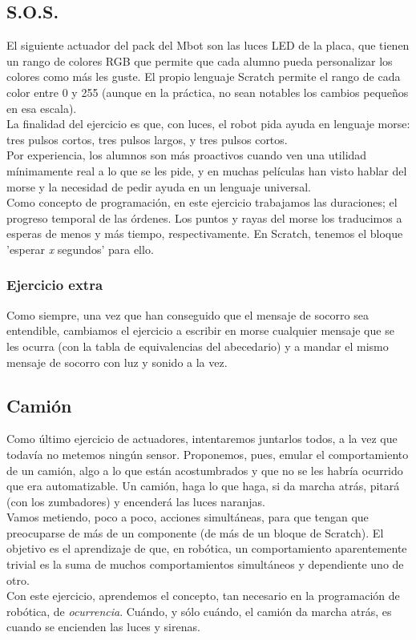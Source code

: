 \subsection{S.O.S.}\label{ej:sos}
El siguiente actuador del pack del Mbot son las luces LED de la placa, que tienen un rango de colores RGB que permite que cada alumno pueda personalizar los colores como más les guste. El propio lenguaje Scratch permite el rango de cada color entre 0 y 255 (aunque en la práctica, no sean notables los cambios pequeños en esa escala).\\
La finalidad del ejercicio es que, con luces, el robot pida ayuda en lenguaje morse: tres pulsos cortos, tres pulsos largos, y tres pulsos cortos. \\
Por experiencia, los alumnos son más proactivos cuando ven una utilidad mínimamente real a lo que se les pide, y en muchas películas han visto hablar del morse y la necesidad de pedir ayuda en un lenguaje universal. \\
Como concepto de programación, en este ejercicio trabajamos las duraciones; el progreso temporal de las órdenes. Los puntos y rayas del morse los traducimos a esperas de menos y más tiempo, respectivamente. En Scratch, tenemos el bloque 'esperar \textit{x} segundos' para ello.
\subsubsection{Ejercicio extra}
Como siempre, una vez que han conseguido que el mensaje de socorro sea entendible, cambiamos el ejercicio a escribir en morse cualquier mensaje que se les ocurra (con la tabla de equivalencias del abecedario) y a mandar el mismo mensaje de socorro con luz y sonido a la vez.

\subsection{Camión}\label{ej:camion}
Como último ejercicio de actuadores, intentaremos juntarlos todos, a la vez que todavía no metemos ningún sensor. Proponemos, pues, emular el comportamiento de un camión, algo a lo que están acostumbrados y que no se les habría ocurrido que era automatizable. Un camión, haga lo que haga, si da marcha atrás, pitará (con los zumbadores) y encenderá las luces naranjas. \\
Vamos metiendo, poco a poco, acciones simultáneas, para que tengan que preocuparse de más de un componente (de más de un bloque de Scratch). El objetivo es el aprendizaje de que, en robótica, un comportamiento aparentemente trivial es la suma de muchos comportamientos simultáneos y dependiente uno de otro.\\
Con este ejercicio, aprendemos el concepto, tan necesario en la programación de robótica, de \textit{ocurrencia}. Cuándo, y sólo cuándo, el camión da marcha atrás, es cuando se encienden las luces y sirenas.

